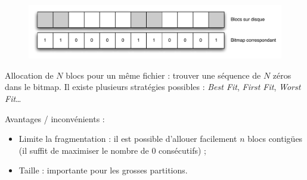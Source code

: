 \documentclass[11pt,english,french]{scrreprt}
\theoremstyle{remark}
\theoremstyle{definition}
\newcommand*\Pitem{%
  \item[\color{green}\scalebox{0.9}{\textbullet}]}
\newcommand*\Citem{%
  \item[\color{red}\scalebox{0.9}{\textbullet}]}
\begin{document}
\begin{figure}[h!]
	\center
	\vspace{-15pt}
	\includegraphics[scale=.85]{img/bitmap}
	\vspace{-15pt}
\end{figure}

Allocation de $N$ blocs pour un même fichier : trouver une séquence de $N$ zéros dans le bitmap. Il existe plusieurs stratégies possibles : \emph{Best Fit}, \emph{First Fit}, \emph{Worst Fit}\dots

Avantages / inconvénients :
\begin{itemize}
	\Pitem Limite la fragmentation : il est possible d'allouer facilement $n$ blocs contigües (il suffit de maximiser le nombre de 0 consécutifs) ;
	\Citem Taille : importante pour les grosses partitions.
\end{itemize}
\end{document}
